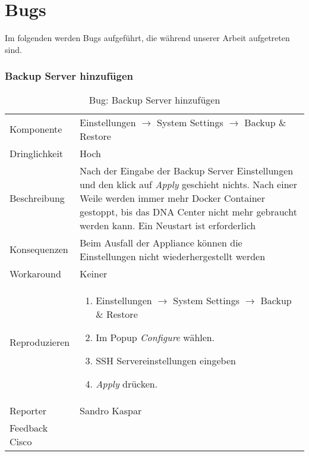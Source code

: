 \section{Bugs}
Im folgenden werden Bugs aufgeführt, die während unserer Arbeit aufgetreten sind. 

\newcommand{\bugreport}[9]{
\subsubsection{#1}
	\begin{table}[H]
		\rowcolors{2}{gray!25}{white}
		\centering
		\begin{tabularx}{\textwidth}{l | X}
			Komponente   & #2       \\
			Dringlichkeit   & #3       \\
			\hline
			Beschreibung   & #4  \\ 
			\hline
			Konsequenzen   & #5  \\ 
			\hline
			Workaround & #6 \\
			\hline
			Reproduzieren & 
			#7
			\\
			\hline
			Reporter  & #8 \\
			Feedback Cisco & #9 \\
		\end{tabularx}
		\caption{Bug: #1}
	\end{table}
}

\bugreport
{Backup Server hinzufügen}
{Einstellungen $\rightarrow$ System Settings $\rightarrow$ Backup \& Restore}
{Hoch}
{Nach der Eingabe der Backup Server Einstellungen und den klick auf \textit{Apply} geschieht nichts. Nach einer Weile werden immer mehr Docker Container gestoppt, bis das DNA Center nicht mehr gebraucht werden kann. Ein Neustart ist erforderlich}
{Beim Ausfall der Appliance können die Einstellungen nicht wiederhergestellt werden}
{Keiner}
{
	\begin{enumerate}
		\item Einstellungen $\rightarrow$ System Settings $\rightarrow$ Backup \& Restore
		\item Im Popup \textit{Configure} wählen. 
		\item SSH Servereinstellungen eingeben
		\item \textit{Apply} drücken. 
	\end{enumerate}
}
{Sandro Kaspar}
{}

